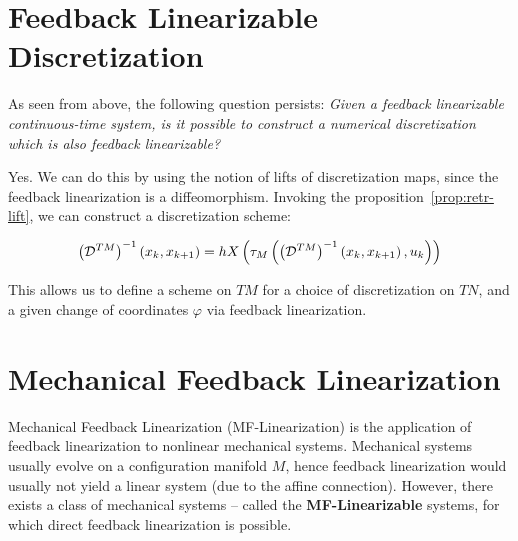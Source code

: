 \section{Feedback Linearizable Discretization}

As seen from above, the following question persists: \textsl{Given a feedback linearizable continuous-time system, is it possible to construct a numerical discretization which is also feedback linearizable?}

Yes. We can do this by using the notion of lifts of discretization maps, since the feedback linearization is a diffeomorphism. Invoking the proposition~\eqref{prop:retr-lift}, we can construct a discretization scheme:

\begin{equation}
    \left(\mathcal{D}^{TM}\right)^{-1}(x_k, x_{k+1}) = hX \left( \tau_M \left( \left( \mathcal{D}^{TM} \right)^{-1} \left( x_k, x_{k+1}\right), u_k  \right) \right) 
\end{equation}

This allows us to define a scheme on $TM$ for a choice of discretization on $TN$, and a given change of coordinates $\varphi$ via feedback linearization.


\section{Mechanical Feedback Linearization}
Mechanical Feedback Linearization (MF-Linearization) is the application of feedback linearization to nonlinear mechanical systems. Mechanical systems usually evolve on a configuration manifold $M$, hence feedback linearization would usually not yield a linear system (due to the affine connection). However, there exists a class of mechanical systems -- called the \textbf{MF-Linearizable} systems, for which direct feedback linearization is possible.

